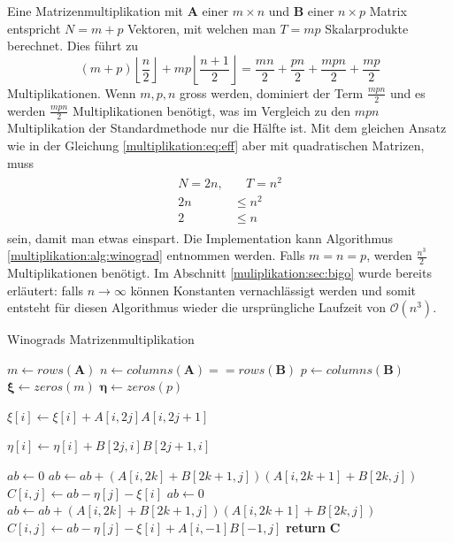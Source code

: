 Eine Matrizenmultiplikation mit $\mathbf{A}$ einer $m \times n$ und $\mathbf{B}$ einer $n \times p$ Matrix entspricht $N=m+p$ Vektoren, mit welchen man $T=mp$ Skalarprodukte berechnet.
Dies f\"uhrt zu
\begin{equation}
		(m+p) \left \lfloor \frac{n}{2} \right \rfloor + mp \left \lfloor \frac{n+1}{2} \right \rfloor = \frac{mn}{2} + \frac{pn}{2} + \frac{mpn}{2} + \frac{mp}{2}
\end{equation}
Multiplikationen.
Wenn $m,p,n$ gross werden, dominiert der Term $\frac{mpn}{2}$ und es werden $\frac{mpn}{2}$ Multiplikationen ben\"otigt, was im Vergleich zu den $mpn$ Multiplikation der Standardmethode nur die H\"alfte ist.
Mit dem gleichen Ansatz wie in der Gleichung \eqref{multiplikation:eq:eff} aber mit quadratischen Matrizen, muss
\begin{align}
	\begin{split}
N=2n, &\quad T = n^2 \\
	2n &\leq n^2 \\
	2 &\leq n
\end{split}
\end{align}
sein, damit man etwas einspart.
Die Implementation kann Algorithmus \ref{multiplikation:alg:winograd} entnommen werden.
Falls $m=n=p$, werden $\frac{n^3}{2}$ Multiplikationen benötigt.
Im Abschnitt \ref{muliplikation:sec:bigo} wurde bereits erläutert: falls $n \rightarrow \infty$ können Konstanten vernachlässigt werden und
 somit entsteht für diesen Algorithmus wieder die ursprüngliche Laufzeit von $\mathcal{O}(n^3 )$.
\begin{algorithm}\footnotesize\caption{Winograds Matrizenmultiplikation}
	\setlength{\lineskip}{7pt}
	\label{multiplikation:alg:winograd}
	\begin{algorithmic}
		\State  $ m \gets rows(\mathbf{A})$
		\State  $ n \gets columns(\mathbf{A}) == rows(\mathbf{B})$
		\State  $ p \gets columns(\mathbf{B})$
		\State  $ \mathbf{\xi} \gets zeros(m)$
		\State  $ \mathbf{\eta} \gets zeros(p)$


		\State $\xi[i] \gets \xi[i]+A[i,2 j]A[i,2 j+1]$
		\EndFor
		\EndFor

		\State $\eta[i] \gets   \eta[i]+B[2 j,i]B[2 j+1,i]$
		\EndFor
		\EndFor

		\State $ab \gets 0$
		\State $ab \gets ab + (A[i,2k]+B[2k+1,j])(A[i,2k+1]+B[2k,j])$
		\EndFor
		\State $C[i,j] \gets ab-\eta[j]-\xi[i]$
		\EndFor
		\EndFor
    \Else
		\State $ab \gets 0$
		\State $ab \gets ab + (A[i,2k]+B[2k+1,j])(A[i,2k+1]+B[2k,j])$
		\EndFor
		\State $C[i,j] \gets ab-\eta[j]-\xi[i]+A[i,-1]B[-1,j]$
		\EndFor
		\EndFor
		\EndIf
		\State \textbf{return} $\textbf{C}$

		\EndFunction
	\end{algorithmic}
\end{algorithm}


